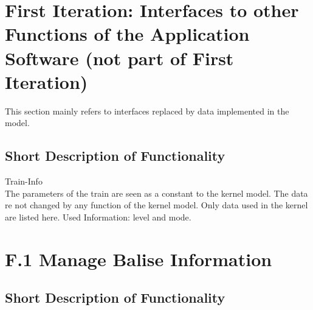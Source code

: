 \documentclass{template/openetcs_report}
\begin{document}
\section{First Iteration: Interfaces to other Functions of the Application Software (not part of First Iteration)}
This section mainly refers to interfaces replaced by data implemented in the model.

\subsection{Short Description of Functionality}

\begin{description}
\item Train-Info\\
The parameters of the train are seen as a constant to the kernel model. The data re not changed by any function of the kernel model. Only data used in the kernel are listed here.
Used Information: level and mode.
\end{description}

\section{F.1 Manage Balise Information}

\subsection{Short Description of Functionality}
\end{document}
